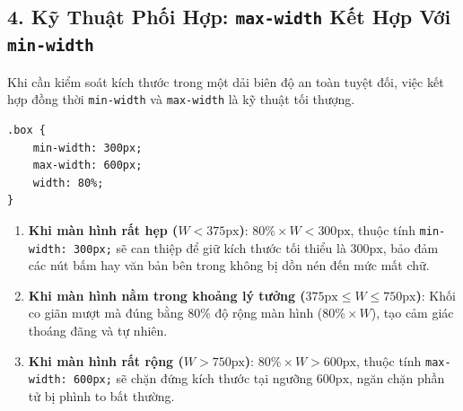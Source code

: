 \documentclass[11pt,oneside]{book}
\newcommand{\thd}[1]{\textcolor{white}{\textbf{\strut #1}}}
\newcommand{\codeinline}[1]{\textcolor{accentOrange}{\texttt{#1}}}
\DeclareRobustCommand{\csshint}[1]{\texorpdfstring{\textcolor{accentOrange}{\textbf{\texttt{#1}}}}{#1}}
\begin{document}
\subsection{4. Kỹ Thuật Phối Hợp: \csshint{max-width} Kết Hợp Với \csshint{min-width}}
\label{subsec:combine_min_max_width}

Khi cần kiểm soát kích thước trong một dải biên độ an toàn tuyệt đối, việc kết hợp đồng thời \codeinline{min-width} và \codeinline{max-width} là kỹ thuật tối thượng.

\begin{prettyTableBox}
\sffamily\small
{}
\end{prettyTableBox}

\begin{codeWindow}
\begin{lstlisting}[language=CSS3]
.box {
    min-width: 300px;
    max-width: 600px;
    width: 80%;
}
\end{lstlisting}
\end{codeWindow}

\begin{conceptBox}
\begin{enumerate}[leftmargin=1.5em, itemsep=3pt, parsep=0pt]
    \item \textbf{Khi màn hình rất hẹp ($W < 375\text{px}$)}: $80\% \times W < 300\text{px}$, thuộc tính \codeinline{min-width: 300px;} sẽ can thiệp để giữ kích thước tối thiểu là $300\text{px}$, bảo đảm các nút bấm hay văn bản bên trong không bị dồn nén đến mức mất chữ.
    \item \textbf{Khi màn hình nằm trong khoảng lý tưởng ($375\text{px} \le W \le 750\text{px}$)}: Khối co giãn mượt mà đúng bằng $80\%$ độ rộng màn hình ($80\% \times W$), tạo cảm giác thoáng đãng và tự nhiên.
    \item \textbf{Khi màn hình rất rộng ($W > 750\text{px}$)}: $80\% \times W > 600\text{px}$, thuộc tính \codeinline{max-width: 600px;} sẽ chặn đứng kích thước tại ngưỡng $600\text{px}$, ngăn chặn phần tử bị phình to bất thường.
\end{enumerate}
\end{conceptBox}
\end{document}
